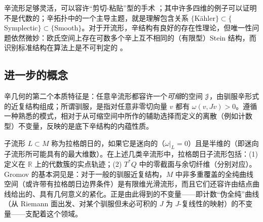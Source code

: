 \documentclass[11pt,a4paper]{article}
\numberwithin{equation}{section}
\newcommand{\bR}{\mathbb{R}}
\newcommand{\bZ}{\mathbb{Z}}
\newcommand{\scrJ}{\EuScript{J}}
\begin{document}

辛流形足够灵活，可以容许“剪切-粘贴”型的手术 \cite{Gompf}；其中许多四维的例子可以证明不是代数的；辛拓扑中的一个主导主题，就是理解包含关系 $\{$K\"ahler$\} \subset \{$Symplectic$\} \subset \{$Smooth$\}$。对于开流形，辛结构有良好的存在性理论，但唯一性问题依然微妙：欧氏空间上存在可数多个辛上互不相同的（有限型）Stein 结构，而识别标准结构在算法上是不可判定的 \cite{McLean:Computability}。

\subsection{进一步的概念}


辛几何的第二个本质特征是：任意辛流形都容许一个\emph{可缩}的空间 $\scrJ$，由驯服辛形式的近复结构组成；所谓驯服，是指对任意非零切向量 $v$ 都有 $\omega(v, Jv) > 0$。遵循一种熟悉的模式，相对于从可缩空间中所作的辅助选择而定义的离散（例如计数型）不变量，反映的是底下辛结构的内蕴性质。


子流形 $L\subset M$ 称为拉格朗日的，如果它是迷向的（$\omega|_L = 0$）且是半维的（即迷向子流形所可能具有的最大维数）。在上述几类辛流形中，拉格朗日子流形包括：(1) 定义在 $\bR$ 上的代数簇的实点轨迹；(2) $T^*Q$ 中的零截面与余切纤维（分别对应）。Gromov 的基本洞见是：对于一般的驯服近复结构，$M$ 中非多重覆盖的全纯曲线空间（或许带有拉格朗日边界条件）是有限维光滑流形，而且它们还容许由结点曲线给出的、具有几何意义的紧化。正是由此得到的不变量——即计数“伪全纯”曲线（从 Riemann 面出发、对某个驯服但未必可积的 $J$ 为 $J$-复线性的映射）的不变量——支配着这个领域。

\end{document}
